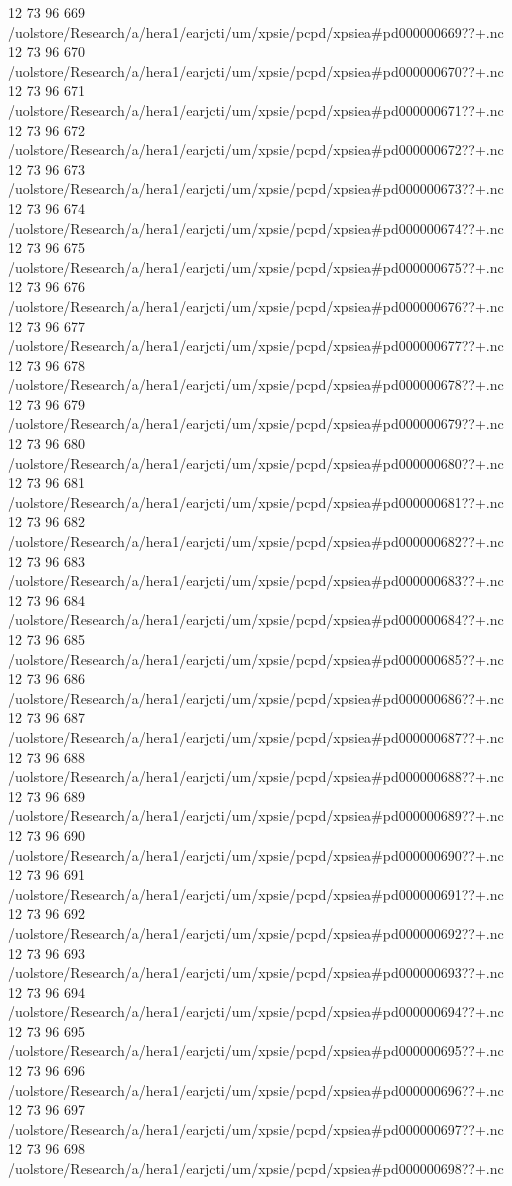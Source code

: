 12 73 96
669
/uolstore/Research/a/hera1/earjcti/um/xpsie/pcpd/xpsiea#pd000000669??+.nc
12 73 96
670
/uolstore/Research/a/hera1/earjcti/um/xpsie/pcpd/xpsiea#pd000000670??+.nc
12 73 96
671
/uolstore/Research/a/hera1/earjcti/um/xpsie/pcpd/xpsiea#pd000000671??+.nc
12 73 96
672
/uolstore/Research/a/hera1/earjcti/um/xpsie/pcpd/xpsiea#pd000000672??+.nc
12 73 96
673
/uolstore/Research/a/hera1/earjcti/um/xpsie/pcpd/xpsiea#pd000000673??+.nc
12 73 96
674
/uolstore/Research/a/hera1/earjcti/um/xpsie/pcpd/xpsiea#pd000000674??+.nc
12 73 96
675
/uolstore/Research/a/hera1/earjcti/um/xpsie/pcpd/xpsiea#pd000000675??+.nc
12 73 96
676
/uolstore/Research/a/hera1/earjcti/um/xpsie/pcpd/xpsiea#pd000000676??+.nc
12 73 96
677
/uolstore/Research/a/hera1/earjcti/um/xpsie/pcpd/xpsiea#pd000000677??+.nc
12 73 96
678
/uolstore/Research/a/hera1/earjcti/um/xpsie/pcpd/xpsiea#pd000000678??+.nc
12 73 96
679
/uolstore/Research/a/hera1/earjcti/um/xpsie/pcpd/xpsiea#pd000000679??+.nc
12 73 96
680
/uolstore/Research/a/hera1/earjcti/um/xpsie/pcpd/xpsiea#pd000000680??+.nc
12 73 96
681
/uolstore/Research/a/hera1/earjcti/um/xpsie/pcpd/xpsiea#pd000000681??+.nc
12 73 96
682
/uolstore/Research/a/hera1/earjcti/um/xpsie/pcpd/xpsiea#pd000000682??+.nc
12 73 96
683
/uolstore/Research/a/hera1/earjcti/um/xpsie/pcpd/xpsiea#pd000000683??+.nc
12 73 96
684
/uolstore/Research/a/hera1/earjcti/um/xpsie/pcpd/xpsiea#pd000000684??+.nc
12 73 96
685
/uolstore/Research/a/hera1/earjcti/um/xpsie/pcpd/xpsiea#pd000000685??+.nc
12 73 96
686
/uolstore/Research/a/hera1/earjcti/um/xpsie/pcpd/xpsiea#pd000000686??+.nc
12 73 96
687
/uolstore/Research/a/hera1/earjcti/um/xpsie/pcpd/xpsiea#pd000000687??+.nc
12 73 96
688
/uolstore/Research/a/hera1/earjcti/um/xpsie/pcpd/xpsiea#pd000000688??+.nc
12 73 96
689
/uolstore/Research/a/hera1/earjcti/um/xpsie/pcpd/xpsiea#pd000000689??+.nc
12 73 96
690
/uolstore/Research/a/hera1/earjcti/um/xpsie/pcpd/xpsiea#pd000000690??+.nc
12 73 96
691
/uolstore/Research/a/hera1/earjcti/um/xpsie/pcpd/xpsiea#pd000000691??+.nc
12 73 96
692
/uolstore/Research/a/hera1/earjcti/um/xpsie/pcpd/xpsiea#pd000000692??+.nc
12 73 96
693
/uolstore/Research/a/hera1/earjcti/um/xpsie/pcpd/xpsiea#pd000000693??+.nc
12 73 96
694
/uolstore/Research/a/hera1/earjcti/um/xpsie/pcpd/xpsiea#pd000000694??+.nc
12 73 96
695
/uolstore/Research/a/hera1/earjcti/um/xpsie/pcpd/xpsiea#pd000000695??+.nc
12 73 96
696
/uolstore/Research/a/hera1/earjcti/um/xpsie/pcpd/xpsiea#pd000000696??+.nc
12 73 96
697
/uolstore/Research/a/hera1/earjcti/um/xpsie/pcpd/xpsiea#pd000000697??+.nc
12 73 96
698
/uolstore/Research/a/hera1/earjcti/um/xpsie/pcpd/xpsiea#pd000000698??+.nc

